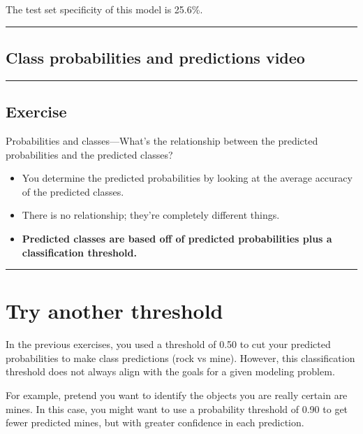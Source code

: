 \documentclass[]{book}
\begin{document}
The test set specificity of this model is 25.6\%.

\begin{center}\rule{0.5\linewidth}{\linethickness}\end{center}

\subsection*{Class probabilities and predictions
video}\label{class-probabilities-and-predictions-video}

\begin{center}\rule{0.5\linewidth}{\linethickness}\end{center}

\subsection*{Exercise}\label{exercise-13}

Probabilities and classes---What's the relationship between the
predicted probabilities and the predicted classes?

\begin{itemize}
\item
  You determine the predicted probabilities by looking at the average
  accuracy of the predicted classes.
\item
  There is no relationship; they're completely different things.
\item
  \textbf{Predicted classes are based off of predicted probabilities
  plus a classification threshold.}
\end{itemize}

\begin{center}\rule{0.5\linewidth}{\linethickness}\end{center}

\section{Try another threshold}\label{try-another-threshold}

In the previous exercises, you used a threshold of 0.50 to cut your
predicted probabilities to make class predictions (rock vs mine).
However, this classification threshold does not always align with the
goals for a given modeling problem.

For example, pretend you want to identify the objects you are really
certain are mines. In this case, you might want to use a probability
threshold of 0.90 to get fewer predicted mines, but with greater
confidence in each prediction.
\end{document}
